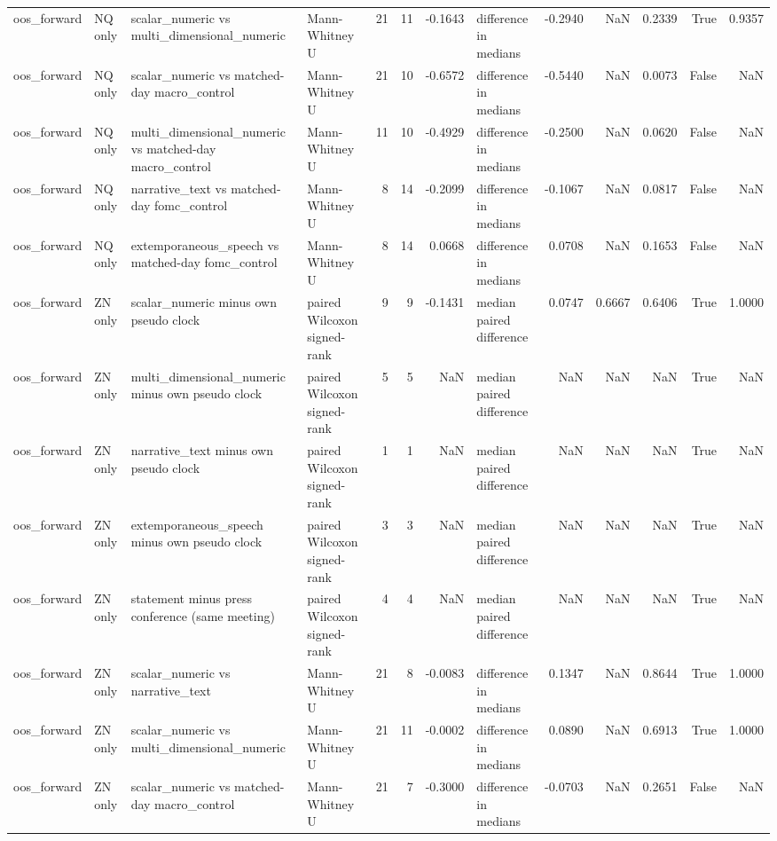 \begin{tabular}{llllrrrlrrrrr}
oos_forward & NQ only & scalar_numeric vs multi_dimensional_numeric & Mann-Whitney U & 21 & 11 & -0.1643 & difference in medians & -0.2940 & NaN & 0.2339 & True & 0.9357 \\
oos_forward & NQ only & scalar_numeric vs matched-day macro_control & Mann-Whitney U & 21 & 10 & -0.6572 & difference in medians & -0.5440 & NaN & 0.0073 & False & NaN \\
oos_forward & NQ only & multi_dimensional_numeric vs matched-day macro_control & Mann-Whitney U & 11 & 10 & -0.4929 & difference in medians & -0.2500 & NaN & 0.0620 & False & NaN \\
oos_forward & NQ only & narrative_text vs matched-day fomc_control & Mann-Whitney U & 8 & 14 & -0.2099 & difference in medians & -0.1067 & NaN & 0.0817 & False & NaN \\
oos_forward & NQ only & extemporaneous_speech vs matched-day fomc_control & Mann-Whitney U & 8 & 14 & 0.0668 & difference in medians & 0.0708 & NaN & 0.1653 & False & NaN \\
oos_forward & ZN only & scalar_numeric minus own pseudo clock & paired Wilcoxon signed-rank & 9 & 9 & -0.1431 & median paired difference & 0.0747 & 0.6667 & 0.6406 & True & 1.0000 \\
oos_forward & ZN only & multi_dimensional_numeric minus own pseudo clock & paired Wilcoxon signed-rank & 5 & 5 & NaN & median paired difference & NaN & NaN & NaN & True & NaN \\
oos_forward & ZN only & narrative_text minus own pseudo clock & paired Wilcoxon signed-rank & 1 & 1 & NaN & median paired difference & NaN & NaN & NaN & True & NaN \\
oos_forward & ZN only & extemporaneous_speech minus own pseudo clock & paired Wilcoxon signed-rank & 3 & 3 & NaN & median paired difference & NaN & NaN & NaN & True & NaN \\
oos_forward & ZN only & statement minus press conference (same meeting) & paired Wilcoxon signed-rank & 4 & 4 & NaN & median paired difference & NaN & NaN & NaN & True & NaN \\
oos_forward & ZN only & scalar_numeric vs narrative_text & Mann-Whitney U & 21 & 8 & -0.0083 & difference in medians & 0.1347 & NaN & 0.8644 & True & 1.0000 \\
oos_forward & ZN only & scalar_numeric vs multi_dimensional_numeric & Mann-Whitney U & 21 & 11 & -0.0002 & difference in medians & 0.0890 & NaN & 0.6913 & True & 1.0000 \\
oos_forward & ZN only & scalar_numeric vs matched-day macro_control & Mann-Whitney U & 21 & 7 & -0.3000 & difference in medians & -0.0703 & NaN & 0.2651 & False & NaN \\

\end{tabular}
